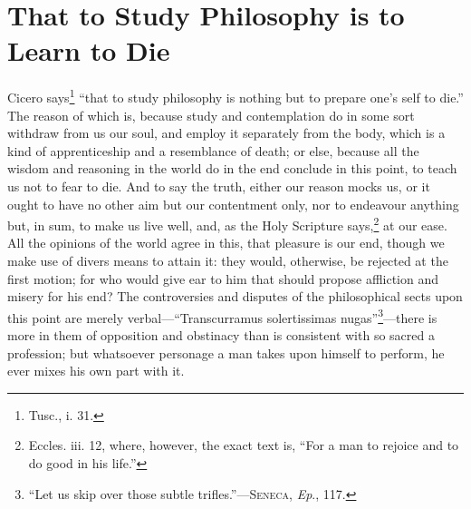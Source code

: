 
\author{Michel de Montaigne}
\chapter{That to Study Philosophy is to Learn to Die}

Cicero says\footnote{Tusc., i. 31.} ``that to study
philosophy is nothing but to prepare one's self to die.'' The reason
of which is, because study and contemplation do in some sort withdraw
from us  our soul, and employ it separately from the body,
which is a kind of apprenticeship and a resemblance of death; or else,
because all the wisdom and reasoning in the world do in the end
conclude in this point, to teach us not to fear to die. And to say the
truth, either our reason mocks us, or it ought to have no other aim
but our contentment only, nor to endeavour anything but, in sum, to
make us live well, and, as the Holy Scripture says,\footnote{Eccles.
iii. 12, where, however, the exact text is, ``For a man to rejoice and
to do good in his life.''} at our ease. All the opinions of the world
agree in this, that pleasure is our end, though we make use of divers
means to attain it: they would, otherwise, be rejected at the first
motion; for who would give ear to him that should propose affliction
and misery for his end? The controversies and disputes of the
philosophical sects upon this point are merely
verbal---``Transcurramus solertissimas nugas''\footnote{``Let us skip
over those subtle trifles.''---\textsc{Seneca}, \textit{Ep}.,
117.}---there is more in them of opposition and obstinacy than is
consistent with so sacred a profession; but whatsoever personage a man
takes upon himself to perform, he ever mixes his own part with it.

